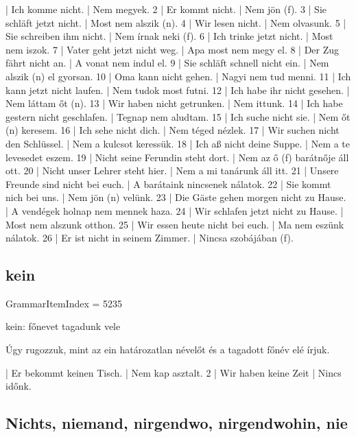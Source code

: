 \documentclass{article}
\newenvironment{desc}{\verbatim}{\endverbatim}
\newenvironment{exmp}{\verbatim}{\endverbatim}
\begin{document}
\begin{exmp}
1 | Ich komme nicht. | Nem megyek.
2 | Er kommt nicht. | Nem jön (f).
3 | Sie schläft jetzt nicht. | Most nem alszik (n).
4 | Wir lesen nicht. | Nem olvasunk.
5 | Sie schreiben ihm nicht. | Nem írnak neki (f).
6 | Ich trinke jetzt nicht. | Most nem iszok.
7 | Vater geht jetzt nicht weg. | Apa most nem megy el.
8 | Der Zug fährt nicht an. | A vonat nem indul el.
9 | Sie schläft schnell nicht ein. | Nem alszik (n) el gyorsan.
10 | Oma kann nicht gehen. | Nagyi nem tud menni.
11 | Ich kann jetzt nicht laufen. | Nem tudok most futni.
12 | Ich habe ihr nicht gesehen. | Nem láttam őt (n).
13 | Wir haben nicht getrunken. | Nem ittunk.
14 | Ich habe gestern nicht geschlafen. | Tegnap nem aludtam.
15 | Ich suche nicht sie. | Nem őt (n) keresem.
16 | Ich sehe nicht dich. | Nem téged nézlek.
17 | Wir suchen nicht den Schlüssel. | Nem a kulcsot keressük.
18 | Ich aß nicht deine Suppe. | Nem a te levesedet eszem.
19 | Nicht seine Ferundin steht dort. | Nem az ő (f) barátnője áll ott.
20 | Nicht unser Lehrer steht hier. | Nem a mi tanárunk áll itt.
21 | Unsere Freunde sind nicht bei euch. | A barátaink nincsenek nálatok.
22 | Sie kommt nich bei uns. | Nem jön (n) velünk.
23 | Die Gäste gehen morgen nicht zu Hause. | A vendégek holnap nem mennek haza.
24 | Wir schlafen jetzt nicht zu Hause. | Most nem alszunk otthon.
25 | Wir essen heute nicht bei euch. | Ma nem eszünk nálatok.
26 | Er ist nicht in seinem Zimmer. | Nincsa szobájában (f).
\end{exmp}

\subsection{kein}

GrammarItemIndex = 5235

\begin{desc}
kein: főnevet tagadunk vele

Úgy rugozzuk, mint az ein határozatlan névelőt és a tagadott főnév elé írjuk.
\end{desc}

\begin{exmp}
1 | Er bekommt keinen Tisch. | Nem kap asztalt.
2 | Wir haben keine Zeit | Nincs időnk.
\end{exmp}

\subsection{Nichts, niemand, nirgendwo, nirgendwohin, nie}
\end{document}

